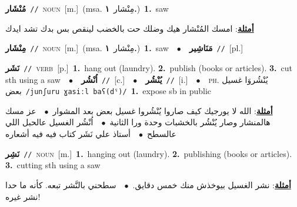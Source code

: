 \documentclass[10pt,a4paper,twoside]{article} %
\begin{document}
\begin{multicols}{2}
{\setlength\topsep{0pt}\textbf{\foreignlanguage{arabic}{مُنْشَار}}\ {\color{gray}\texttt{//}\color{black}}\ \textsc{noun}\ [m.]\ \color{gray}(msa. \foreignlanguage{arabic}{مِنْشار}~\foreignlanguage{arabic}{\textbf{١.}})\color{black}\ \textbf{1.}~saw\  \begin{flushright}\color{gray}\foreignlanguage{arabic}{\textbf{\underline{\foreignlanguage{arabic}{أمثلة}}}: امسك المُنْشار هيك وضلك حت بالخضب لينقص بس بدك تشد ايدك}\end{flushright}\color{black}} \vspace{2mm}

{\setlength\topsep{0pt}\textbf{\foreignlanguage{arabic}{مِنْشَار}}\ {\color{gray}\texttt{//}\color{black}}\ \textsc{noun}\ [m.]\ \color{gray}(msa. \foreignlanguage{arabic}{مِنْشار}~\foreignlanguage{arabic}{\textbf{١.}})\color{black}\ \textbf{1.}~saw\ \ $\bullet$\ \ \setlength\topsep{0pt}\textbf{\foreignlanguage{arabic}{مَنَاشِير}}\ {\color{gray}\texttt{//}\color{black}}\ [pl.]\ } \vspace{2mm}

{\setlength\topsep{0pt}\textbf{\foreignlanguage{arabic}{نَشَر}}\ {\color{gray}\texttt{//}\color{black}}\ \textsc{verb}\ [p.]\ \textbf{1.}~hang out (laundry).  \textbf{2.}~publish (books or articles).  \textbf{3.}~cut sth using a saw\ \ $\bullet$\ \ \setlength\topsep{0pt}\textbf{\foreignlanguage{arabic}{اُنْشُر}}\ {\color{gray}\texttt{//}\color{black}}\ [c.]\ \ $\bullet$\ \ \setlength\topsep{0pt}\textbf{\foreignlanguage{arabic}{يُنْشُر}}\ {\color{gray}\texttt{//}\color{black}}\ [i.]\ \ $\bullet$\ \ \textsc{ph.} \color{gray} \foreignlanguage{arabic}{يُنْشُروَا غسيل بعض}\color{black}\ {\color{gray}\texttt{/{\sffamily junʃuru ɣasiːl baʕ(dˤ)}/}\color{black}}\ \textbf{1.}~expose sb in public\  \begin{flushright}\color{gray}\foreignlanguage{arabic}{\textbf{\underline{\foreignlanguage{arabic}{أمثلة}}}: الله لا يورجيك كيف صاروا يُنْشُروا غسيل بعض بعد المشوار\ $\bullet$\ \  عز مسك هالمنشار وصار يُنْشُر بالخشبات وحدة ورا الثانية\ $\bullet$\ \  اُنْشُر الغسيل عالحبل اللي عالسطح\ $\bullet$\ \  أستاذ علي نَشَر كتاب فيه فيه أشعاره}\end{flushright}\color{black}} \vspace{2mm}

{\setlength\topsep{0pt}\textbf{\foreignlanguage{arabic}{نَشِر}}\ {\color{gray}\texttt{//}\color{black}}\ \textsc{noun}\ [m.]\ \textbf{1.}~hanging out (laundry).  \textbf{2.}~publishing (books or articles).  \textbf{3.}~cutting sth using a saw\  \begin{flushright}\color{gray}\foreignlanguage{arabic}{\textbf{\underline{\foreignlanguage{arabic}{أمثلة}}}: نشر الغسيل بيوخذش منك خمس دقايق.\ $\bullet$\ \  سطحني بالنَّشر تبعه. كأنه ما حدا نشر غيره!}\end{flushright}\color{black}} \vspace{2mm}


\end{multicols}
\end{document}
